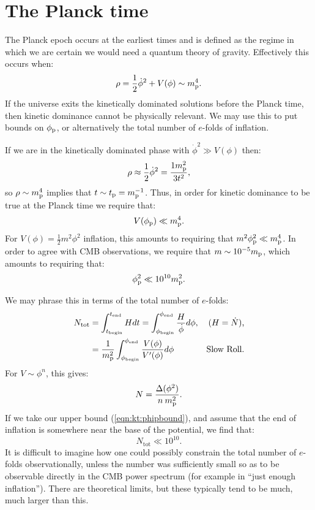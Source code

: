 \section{The Planck time}
The Planck epoch occurs at the earliest times and is defined as the
regime in which we are certain we would need a quantum theory of
gravity. Effectively this occurs when:
\begin{equation}
  \rho = \frac{1}{2}\dot\phi^2 + V(\phi)  \sim m_{\mathrm{p}}^4.
  \label{eqn:kt:rhosim}
\end{equation}
If the universe exits the kinetically dominated solutions before the
Planck time, then kinetic dominance cannot be physically relevant. We
may use this to put bounds on \(\phi_{\mathrm{p}}\), or alternatively the total
number of \(e\)-folds of inflation.

If we are in the kinetically dominated phase with \(\dot{\phi}^2\gg
V(\phi)\) then:
\begin{equation}
  \rho \approx \frac{1}{2}\dot\phi^2= \frac{1m_{\mathrm{p}}^2}{3t^2} ,
  \label{eqn:kt:rhop}
\end{equation}
so \(\rho\sim m_{\mathrm{p}}^4\) implies that \(t\sim t_{\mathrm{p}}=m_{\mathrm{p}}^{-1}\). Thus, in order for
kinetic dominance to be true at the Planck time we require that:
\begin{equation}
  V(\phi_{\mathrm{p}}) \ll m_{\mathrm{p}}^4.
\end{equation}
For \(V(\phi) = \frac{1}{2}m^2\phi^2\) inflation, this amounts to requiring that \(m^2\phi_{\mathrm{p}}^2\ll m_{\mathrm{p}}^4\). In order to agree with CMB observations, we require
that \(m\sim10^{-5}m_{\mathrm{p}}\), which amounts to requiring that:
\begin{equation}
 \phi_{\mathrm{p}}^2 \ll 10^{10}m_{\mathrm{p}}^2 \nonumber.
 \label{eqn:kt:phipbound}
\end{equation}

We may phrase this in terms of the total number of \(e\)-folds:
\begin{align}
  N_\mathrm{tot} 
  &=\int_{t_\mathrm{begin}}^{t_\mathrm{end}} H dt 
  =\int_{\phi_\mathrm{begin}}^{\phi_\mathrm{end}} 
       \frac{H}{\dot{\phi}}d\phi,  &\text{(\(H=\dot{N}\)),}
  \\
  &=\frac{1}{m_{\mathrm{p}}^2}\int_{\phi_\mathrm{begin}}^{\phi_\mathrm{end}}
     {\frac{V(\phi)}{V^\prime(\phi)}}d\phi &\text{Slow Roll.}
\end{align}
For \(V\sim\phi^n\), this gives:
\begin{equation}
  N = \frac{\Delta (\phi^2) }{n\:m_{\mathrm{p}}^2}.
\end{equation}
If we take our upper bound (\ref{eqn:kt:phipbound}), and assume that the
end of inflation is somewhere near the base of the potential, we find
that: 
\begin{equation}
  N_\mathrm{tot}\ll 10^{10}.
\end{equation}
It is difficult to imagine how one could possibly constrain the total
number of \(e\)-folds observationally, unless the number was
sufficiently small so as to be observable directly in the CMB power
spectrum (for example in ``just enough inflation''). There are
theoretical limits, but these typically tend to be much, much larger
than this.

